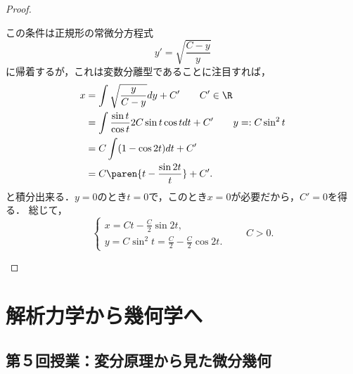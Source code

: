\documentclass[uplatex,dvipdfmx]{jsarticle}
\begin{document}
\begin{proof}
\begin{enumerate}[{Step}1]
        この条件は正規形の常微分方程式
        \[y'=\sqrt{\frac{C-y}{y}}\]
        に帰着するが，これは変数分離型であることに注目すれば，
        \begin{align*}
            x&=\int\sqrt{\frac{y}{C-y}}dy+C'\qquad C'\in\R\\
            &=\int\frac{\sin t}{\cos t}2C\sin t\cos tdt+C'\qquad y=:C\sin^2t\\
            &=C\int(1-\cos 2t)dt+C'\\
            &=C\paren{t-\frac{\sin 2t}{t}}+C'.
        \end{align*}
        と積分出来る．$y=0$のとき$t=0$で，このとき$x=0$が必要だから，$C'=0$を得る．
        総じて，
        \[\begin{cases}
            x=Ct-\frac{C}{2}\sin 2t,\\
            y=C\sin^2t=\frac{C}{2}-\frac{C}{2}\cos 2t.
        \end{cases}\qquad C>0.\]
    \end{enumerate}
\end{proof}

\section{解析力学から幾何学へ}

\subsection{第５回授業：変分原理から見た微分幾何}
\end{document}
